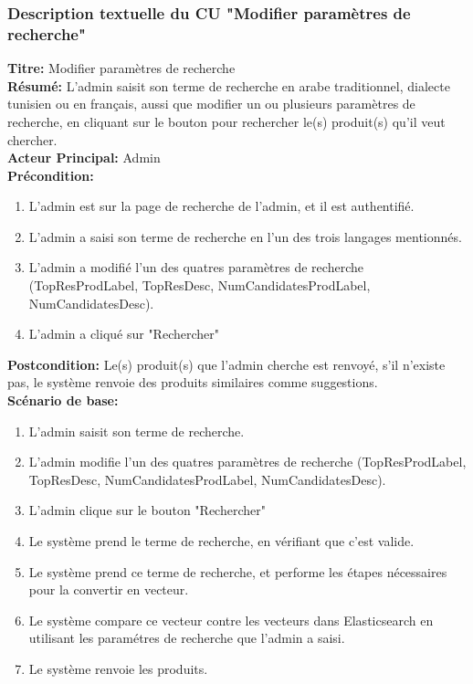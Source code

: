 \subsubsection{Description textuelle du CU "Modifier paramètres de recherche"}
\noindent
\textbf{Titre:} Modifier paramètres de recherche \\
\textbf{Résumé:} L'admin saisit son terme de recherche en arabe traditionnel, dialecte tunisien ou en français, aussi que modifier un ou plusieurs paramètres de recherche, en cliquant sur le bouton pour rechercher le(s) produit(s) qu'il veut chercher. \\
\textbf{Acteur Principal:} Admin \\
\textbf{Précondition:} \begin{enumerate}
	\item L'admin est sur la page de recherche de l'admin, et il est authentifié.
	\item L'admin a saisi son terme de recherche en l'un des trois langages mentionnés.
	\item L'admin a modifié l'un des quatres paramètres de recherche (TopResProdLabel, TopResDesc, NumCandidatesProdLabel, NumCandidatesDesc).
	\item L'admin a cliqué sur "Rechercher"
\end{enumerate}
\textbf{Postcondition:} Le(s) produit(s) que l'admin cherche est renvoyé, s'il n'existe pas, le système renvoie des produits similaires comme suggestions. \\
\textbf{Scénario de base: }
\begin{enumerate}
	\item L'admin saisit son terme de recherche.
	\item L'admin modifie l'un des quatres paramètres de recherche (TopResProdLabel, TopResDesc, NumCandidatesProdLabel, NumCandidatesDesc).
	\item L'admin clique sur le bouton "Rechercher"
	\item Le système prend le terme de recherche, en vérifiant que c'est valide.
	\item Le système prend ce terme de recherche, et performe les étapes nécessaires pour la convertir en vecteur.
	\item Le système compare ce vecteur contre les vecteurs dans Elasticsearch en utilisant les paramétres de recherche que l'admin a saisi.
	\item Le système renvoie les produits.
\end{enumerate}

